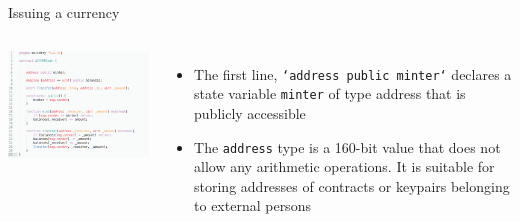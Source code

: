\documentclass[11pt]{beamer}
\begin{document}

\begin{frame}{Issuing a currency}
	\begin{columns}
	    \includegraphics  [scale=0.3]{Images/contract_new}

	    \begin{itemize}
		    \item The first line, \texttt{`address public minter`} declares a state variable \texttt{minter} of type address that is publicly accessible
			\item The \texttt{address} type is a 160-bit value that does not allow any arithmetic operations. It is suitable for storing addresses of contracts or keypairs belonging to external persons
	    \end{itemize}
	\end{columns}
\end{frame}

\end{document}
